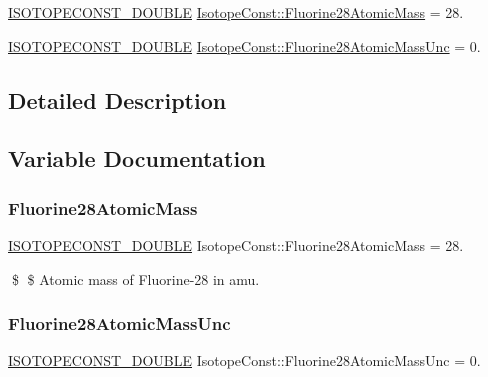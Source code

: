 \begin{DoxyCompactItemize}
\item 
\mbox{\hyperlink{group___isotope_const-_macros_ga8f45a7272ce02c0b4c65c44636ed719a}{I\+S\+O\+T\+O\+P\+E\+C\+O\+N\+S\+T\+\_\+\+D\+O\+U\+B\+LE}} \mbox{\hyperlink{group___isotope_const-_fluorine-_f28_ga4bef45ed1aec638063ed170bf966843d}{Isotope\+Const\+::\+Fluorine28\+Atomic\+Mass}} = 28.
\item 
\mbox{\hyperlink{group___isotope_const-_macros_ga8f45a7272ce02c0b4c65c44636ed719a}{I\+S\+O\+T\+O\+P\+E\+C\+O\+N\+S\+T\+\_\+\+D\+O\+U\+B\+LE}} \mbox{\hyperlink{group___isotope_const-_fluorine-_f28_gae8b2a5659c6081695a18cbcded0e1642}{Isotope\+Const\+::\+Fluorine28\+Atomic\+Mass\+Unc}} = 0.
\end{DoxyCompactItemize}


\subsection{Detailed Description}


\subsection{Variable Documentation}
\mbox{\label{group___isotope_const-_fluorine-_f28_ga4bef45ed1aec638063ed170bf966843d}} 
\subsubsection{\texorpdfstring{Fluorine28\+Atomic\+Mass}{Fluorine28AtomicMass}}
{\footnotesize\ttfamily \mbox{\hyperlink{group___isotope_const-_macros_ga8f45a7272ce02c0b4c65c44636ed719a}{I\+S\+O\+T\+O\+P\+E\+C\+O\+N\+S\+T\+\_\+\+D\+O\+U\+B\+LE}} Isotope\+Const\+::\+Fluorine28\+Atomic\+Mass = 28.}

\$ \$ Atomic mass of Fluorine-\/28 in amu. \mbox{\label{group___isotope_const-_fluorine-_f28_gae8b2a5659c6081695a18cbcded0e1642}} 
\subsubsection{\texorpdfstring{Fluorine28\+Atomic\+Mass\+Unc}{Fluorine28AtomicMassUnc}}
{\footnotesize\ttfamily \mbox{\hyperlink{group___isotope_const-_macros_ga8f45a7272ce02c0b4c65c44636ed719a}{I\+S\+O\+T\+O\+P\+E\+C\+O\+N\+S\+T\+\_\+\+D\+O\+U\+B\+LE}} Isotope\+Const\+::\+Fluorine28\+Atomic\+Mass\+Unc = 0.}

